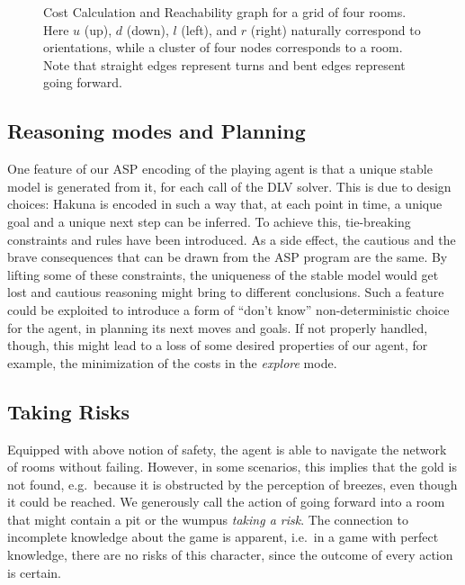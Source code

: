 \documentclass{llncs}
\begin{document}

\begin{figure}
	\begin{center}
		
	\end{center}
	\caption[Cost Calculation and Reachability graph]{Cost Calculation and Reachability graph for a grid of four rooms. Here $u$ (up), $d$ (down), $l$ (left), and $r$ (right) naturally correspond to orientations, while a cluster of four nodes corresponds to a room. Note that straight edges represent turns and bent edges represent going forward.}
	\label{fig:graph}
\end{figure}

\subsection{Reasoning modes and Planning}

One feature of our ASP encoding of the playing agent is that a unique stable model is generated from it, for each call of the DLV solver.
This is due to design choices: Hakuna is encoded in such a way that, at each point in time, a unique goal and a unique next step can be inferred.
To achieve this, tie-breaking constraints and rules have been introduced.
As a side effect, the cautious and the brave consequences that can be drawn from the ASP program are the same.
By lifting some of these constraints, the uniqueness of the stable model would get lost and cautious reasoning might bring to different conclusions.
Such a feature could be exploited to introduce a form of ``don't know'' non-deterministic choice for the agent, in planning its next moves and goals.
If not properly handled, though, this might lead to a loss of some desired properties of our agent, for example, the minimization of the costs in the \emph{explore} mode.

\subsection{Taking Risks}
Equipped with above notion of safety, the agent is able to navigate the network of rooms without failing. However, in some scenarios, this implies that the gold is not found, e.g.\ because it is obstructed by the perception of breezes, even though it could be reached. We generously call the action of going forward into a room that might contain a pit or the wumpus \emph{taking a risk}. The connection to incomplete knowledge about the game is apparent, i.e.\ in a game with perfect knowledge, there are no risks of this character, since the outcome of every action is certain.
\end{document}
